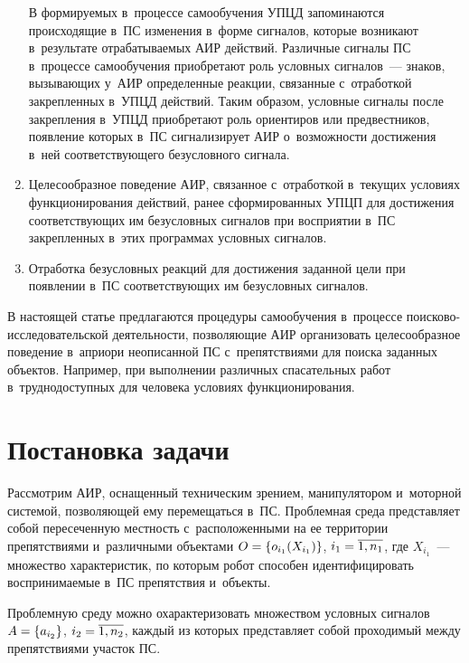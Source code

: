 \begin{multicols}{2}
\begin{enumerate}[1.]
  В формируемых в~процессе самообучения \mbox{УПЦД} запоминаются происходящие в~ПС
изменения в~форме сигналов, которые возникают в~результате от\-ра\-ба\-ты\-ва\-емых 
АИР действий. Различные сигналы ПС в~процессе са\-мо\-обуче\-ния 
приобретают роль услов\-ных сигналов~--- знаков, вы\-зы\-ва\-ющих у~АИР 
определенные реакции, связанные с~отработкой за\-креп\-лен\-ных в~УПЦД 
действий. Таким образом, услов\-ные сигналы после за\-креп\-ле\-ния в~УПЦД 
приобретают роль ориентиров или предвестников, появление которых 
в~ПС сигнализирует АИР о~воз\-мож\-ности достижения в~ней 
соответствующего без\-услов\-но\-го сигнала.
  \item  Целесообразное поведение АИР, связанное с~отработкой в~текущих 
условиях функционирования действий, ранее сформированных УПЦП для 
достижения со\-от\-вет\-ст\-ву\-ющих им без\-услов\-ных сигналов при восприятии 
в~ПС закрепленных в~этих программах услов\-ных сигналов. 
  \item Отработка безусловных реакций для достижения заданной цели при 
появлении в~ПС со\-от\-вет\-ст\-ву\-ющих им без\-услов\-ных сигналов.
  \end{enumerate}
  
  В настоящей статье предлагаются процедуры са\-мо\-обуче\-ния в~процессе  
по\-иско\-во-ис\-сле\-до\-ва\-тель\-ской деятельности, поз\-во\-ля\-ющие АИР 
организовать целесообразное поведение в~априори \mbox{неописанной} 
ПС с~препятствиями для поиска заданных объектов. Например, при 
выполнении различных спасательных работ в~труднодоступных для человека 
условиях функционирования.
  
\section{Постановка задачи}

  Рассмотрим АИР, оснащенный техническим зрением, манипулятором 
и~моторной сис\-те\-мой, поз\-во\-ля\-ющей ему перемещаться в~ПС. 
Проблемная среда пред\-став\-ля\-ет собой пересеченную мест\-ность 
с~расположенными на ее территории препятствиями и~различными объектами 
$O\hm= \{ o_{i_1}(X_{i_1})\}$, $i_1\hm= \overline{1,n_1}$, где $X_{i_1}$~--- 
множество характеристик, по которым робот способен идентифицировать 
воспринимаемые в~ПС препятствия и~объекты. 
  
  Проблемную среду можно охарактеризовать множеством условных сигналов 
  $A\hm= \{a_{i_2}\}$, $i_2\hm=\overline{1,n_2}$, каждый из которых 
пред\-став\-ля\-ет собой проходимый меж\-ду препятствиями участок ПС.
  

\end{multicols}

